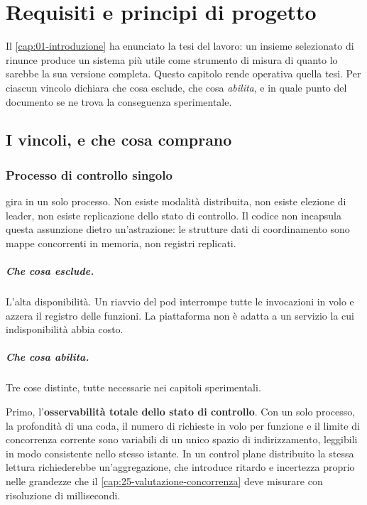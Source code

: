 \chapter{Requisiti e principi di progetto}
\label{cap:03-requisiti-principi}

Il \cref{cap:01-introduzione} ha enunciato la tesi del lavoro: un insieme
selezionato di rinunce produce un sistema pi\`u utile come strumento di misura
di quanto lo sarebbe la sua versione completa. Questo capitolo rende operativa
quella tesi. Per ciascun vincolo dichiara che cosa esclude, che cosa
\emph{abilita}, e in quale punto del documento se ne trova la conseguenza
sperimentale.

\section{I vincoli, e che cosa comprano}

\subsection{Processo di controllo singolo}

\nf{} gira in un solo processo. Non esiste modalit\`a distribuita, non esiste
elezione di leader, non esiste replicazione dello stato di controllo. Il codice
non incapsula questa assunzione dietro un'astrazione: le strutture dati di
coordinamento sono mappe concorrenti in memoria, non registri replicati.

\paragraph{Che cosa esclude.} L'alta disponibilit\`a. Un riavvio del pod
interrompe tutte le invocazioni in volo e azzera il registro delle funzioni. La
piattaforma non \`e adatta a un servizio la cui indisponibilit\`a abbia costo.

\paragraph{Che cosa abilita.} Tre cose distinte, tutte necessarie nei capitoli
sperimentali.

Primo, l'\textbf{osservabilit\`a totale dello stato di controllo}. Con un solo
processo, la profondit\`a di una coda, il numero di richieste in volo per
funzione e il limite di concorrenza corrente sono variabili di un unico spazio
di indirizzamento, leggibili in modo consistente nello stesso istante. In un
control plane distribuito la stessa lettura richiederebbe un'aggregazione, che
introduce ritardo e incertezza proprio nelle grandezze che il
\cref{cap:25-valutazione-concorrenza} deve misurare con risoluzione di
millisecondi.

